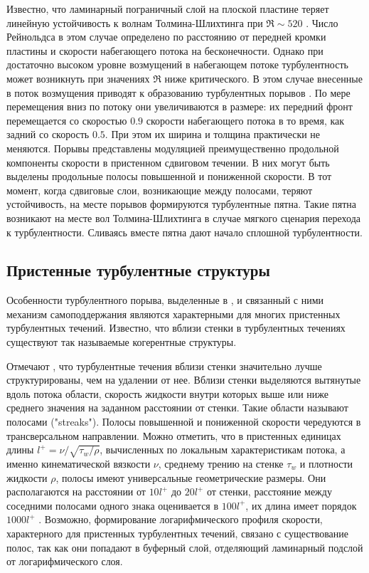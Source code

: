Известно, что ламинарный пограничный слой на плоской пластине теряет линейную устойчивость к волнам Толмина-Шлихтинга при $\Re \sim 520$ \cite{Schlichting2004}. Число Рейнольдса в этом случае определено по расстоянию от передней кромки пластины и скорости набегающего потока на бесконечности. Однако при достаточно высоком уровне возмущений в набегающем потоке турбулентность может возникнуть при значениях $\Re$ ниже критического. В этом случае внесенные в поток возмущения приводят к образованию турбулентных порывов \cite{Katasonov2014}. По мере перемещения вниз по потоку они увеличиваются в размере: их передний фронт перемещается со скоростью $0.9$ скорости набегающего потока в то время, как задний со скорость $0.5$. При этом их ширина и толщина практически не меняются. Порывы представлены модуляцией преимущественно продольной компоненты скорости в пристенном сдвиговом течении. В них могут быть выделены продольные полосы повышенной и пониженной скорости. В тот момент, когда сдвиговые слои, возникающие между полосами, теряют устойчивость, на месте порывов формируются турбулентные пятна. Такие пятна возникают на месте вол Толмина-Шлихтинга в случае мягкого сценария перехода к турбулентности. Сливаясь вместе пятна дают начало сплошной турбулентности. 


	\subsection{Пристенные турбулентные структуры} \label{structure_subsection}

Особенности турбулентного порыва, выделенные в \cite{Shimizu2009}, и связанный с ними механизм самоподдержания являются характерными для многих пристенных турбулентных течений. Известно, что вблизи стенки в турбулентных течениях существуют так называемые когерентные структуры. 

Отмечают \cite{Kline1967}, что турбулентные течения вблизи стенки значительно лучше структурированы, чем на удалении от нее. Вблизи стенки выделяются вытянутые вдоль потока области, скорость жидкости внутри которых выше или ниже среднего значения на заданном расстоянии от стенки. Такие области называют полосами ("streaks"). Полосы повышенной и пониженной скорости чередуются в трансверсальном направлении. Можно отметить, что в пристенных единицах длины $l^+ = \nu / \sqrt{\tau_{w} / \rho}$, вычисленных по локальным характеристикам потока, а именно кинематической вязкости $\nu$, среднему трению на стенке $\tau_{w}$ и плотности жидкости $\rho$, полосы имеют универсальные геометрические размеры. Они располагаются на расстоянии от $10 l^+$ до $20 l^+$ от стенки, расстояние между соседними полосами одного знака оценивается в $100 l^+$, их длина имеет порядок $1000 l^+$ \cite{Klebanoff1962, Kline1967}. Возможно, формирование логарифмического профиля скорости, характерного для пристенных турбулентных течений, связано с существование полос, так как они попадают в буферный слой, отделяющий ламинарный подслой от логарифмического слоя. 

